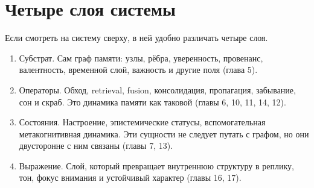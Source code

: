 \section{Четыре слоя системы}

Если смотреть на систему сверху, в ней удобно различать четыре слоя.

\begin{enumerate}
\item Субстрат. Сам граф памяти: узлы, рёбра, уверенность, провенанс, валентность, временной слой, важность и другие поля (глава 5).
\item Операторы. Обход, retrieval, fusion, консолидация, пропагация, забывание, сон и скраб. Это динамика памяти как таковой (главы 6, 10, 11, 14, 12).
\item Состояния. Настроение, эпистемические статусы, вспомогательная метакогнитивная динамика. Эти сущности не следует путать с графом, но они двусторонне с ним связаны (главы 7, 13).
\item Выражение. Слой, который превращает внутреннюю структуру в реплику, тон, фокус внимания и устойчивый характер (главы 16, 17).
\end{enumerate}

\begin{center}
\label{fig:layers}
\end{center}

